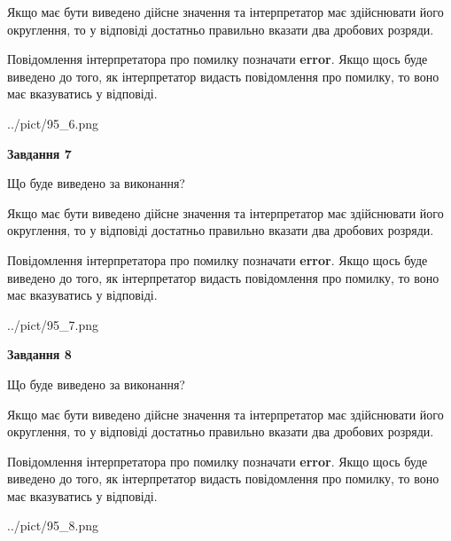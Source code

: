 \documentclass[12pt, ukrainian]{article}
\begin{document}
{\begin {Large}
Якщо має бути виведено дійсне значення та інтерпретатор має здійснювати його округлення, 
то у відповіді достатньо правильно вказати два дробових розряди.

Повідомлення інтерпретатора про помилку позначати \textbf{error}.
Якщо щось буде виведено до того, як інтерпретатор видасть повідомлення про помилку, 
то воно має вказуватись у відповіді. \par

\begin{center}
	{../pict/95_6.png}
\end{center}
\newpage

{\begin {center}\textbf{Завдання 7}\end {center}}\par
Що буде виведено за виконання? \par

Якщо має бути виведено дійсне значення та інтерпретатор має здійснювати його округлення, 
то у відповіді достатньо правильно вказати два дробових розряди.

Повідомлення інтерпретатора про помилку позначати \textbf{error}.
Якщо щось буде виведено до того, як інтерпретатор видасть повідомлення про помилку, 
то воно має вказуватись у відповіді. \par

\begin{center}
	{../pict/95_7.png}
\end{center}
\newpage

{\begin {center}\textbf{Завдання 8}\end {center}}\par
Що буде виведено за виконання? \par

Якщо має бути виведено дійсне значення та інтерпретатор має здійснювати його округлення, 
то у відповіді достатньо правильно вказати два дробових розряди.

Повідомлення інтерпретатора про помилку позначати \textbf{error}.
Якщо щось буде виведено до того, як інтерпретатор видасть повідомлення про помилку, 
то воно має вказуватись у відповіді. \par

\begin{center}
	{../pict/95_8.png}
\end{center}
\newpage


\end{Large}}
\end{document}
